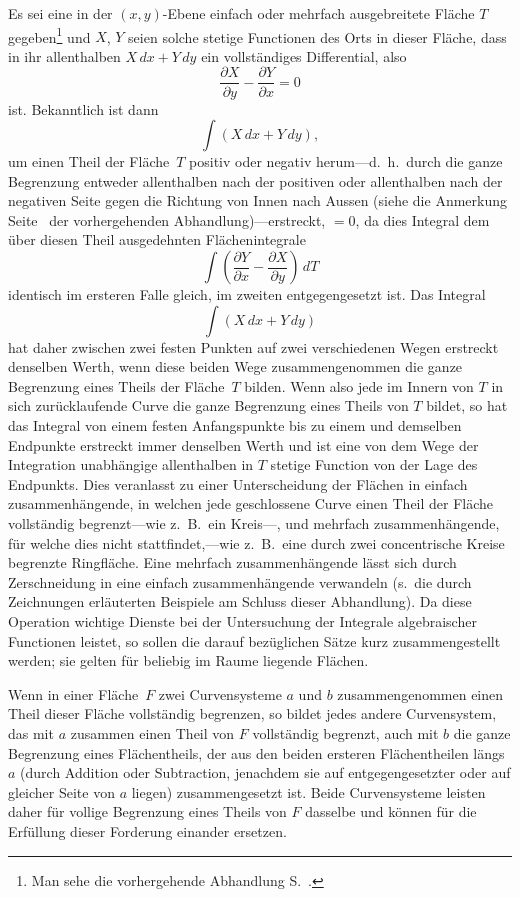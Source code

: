 \documentclass[a4paper,12pt,leqno]{article}
\begin{document}
Es sei eine in der $(x,y)$-Ebene einfach oder mehrfach
ausgebreitete Fl\"{a}che $T$ gegeben\footnote{Man sehe die
vorhergehende Abhandlung S.~\pageref{`Flaeche'}.}
und $X$, $Y$ seien solche stetige Functionen des Orts in dieser
Fl\"{a}che, dass in ihr allenthalben $X \, dx + Y \, dy$ ein
vollst\"{a}ndiges Differential, also
\[ \frac{\partial X}{\partial y} - \frac{\partial Y}{\partial x} = 0 \]
ist.  Bekanntlich ist dann
\[ \int (X \, dx + Y \, dy),\]
um einen Theil der Fl\"{a}che~$T$ positiv oder negativ
herum---d.~h.\ durch die ganze Begrenzung entweder allenthalben
nach der positiven oder allenthalben nach der negativen Seite
gegen die Richtung von Innen nach Aussen (siehe die Anmerkung 
Seite~\pageref{`positiv'} der vorhergehenden
Abhandlung)---erstreckt, $= 0$, da dies Integral dem \"{u}ber
diesen Theil ausgedehnten Fl\"{a}chenintegrale
\[ \int  \left(
            \frac{\partial Y}{\partial x}
          - \frac{\partial X}{\partial y}
         \right) \, dT \]
identisch im ersteren Falle gleich, im zweiten entgegengesetzt
ist.  Das Integral
\[ \int (X \, dx + Y \, dy) \]
hat daher zwischen zwei festen Punkten auf zwei verschiedenen
Wegen erstreckt denselben Werth, wenn diese beiden Wege
zusammengenommen die ganze Begrenzung eines Theils der
Fl\"{a}che~$T$ bilden.  Wenn also jede im Innern von $T$ in sich
zur\"{u}cklaufende Curve die ganze Begrenzung eines Theils von $T$
bildet, so hat das Integral von einem festen Anfangspunkte bis zu
einem und demselben Endpunkte erstreckt immer denselben Werth und
ist eine von dem Wege der Integration unabh\"{a}ngige
allenthalben in $T$ stetige Function von der Lage des Endpunkts.
Dies veranlasst zu einer Unterscheidung der Fl\"{a}chen in
einfach zusammenh\"{a}ngende, in welchen jede geschlossene Curve
einen Theil der Fl\"{a}che vollst\"{a}ndig begrenzt---wie
z.~B.\ ein Kreis---, und mehrfach zusammenh\"{a}ngende, f\"{u}r
welche dies nicht stattfindet,---wie z.~B.\ eine durch zwei
concentrische Kreise begrenzte Ringfl\"{a}che.  Eine mehrfach
zusammenh\"{a}ngende l\"{a}sst sich durch
Zerschneidung in eine einfach zusammenh\"{a}ngende verwandeln
(s.\ die durch Zeichnungen erl\"{a}uterten Beispiele am Schluss
dieser Abhandlung).  Da diese Operation wichtige Dienste bei der
Untersuchung der Integrale algebraischer Functionen leistet, so
sollen die darauf bez\"{u}glichen S\"{a}tze kurz zusammengestellt
werden; sie gelten f\"{u}r beliebig im Raume liegende
Fl\"{a}chen.

Wenn in einer Fl\"{a}che~$F$ zwei Curvensysteme $a$ und $b$
zusammengenommen einen Theil dieser Fl\"{a}che vollst\"{a}ndig
begrenzen, so bildet jedes andere Curvensystem, das mit $a$
zusammen einen Theil von $F$ vollst\"{a}ndig begrenzt, auch mit
$b$ die ganze Begrenzung eines Fl\"{a}chentheils, der aus den
beiden ersteren Fl\"{a}chentheilen l\"{a}ngs $a$ (durch Addition
oder Subtraction, jenachdem sie auf entgegengesetzter oder auf
gleicher Seite von $a$ liegen) zusammengesetzt ist.  Beide
Curvensysteme leisten daher f\"{u}r vollige Begrenzung eines
Theils von $F$ dasselbe und k\"{o}nnen f\"{u}r die Erf\"{u}llung
dieser Forderung einander ersetzen.
\end{document}
